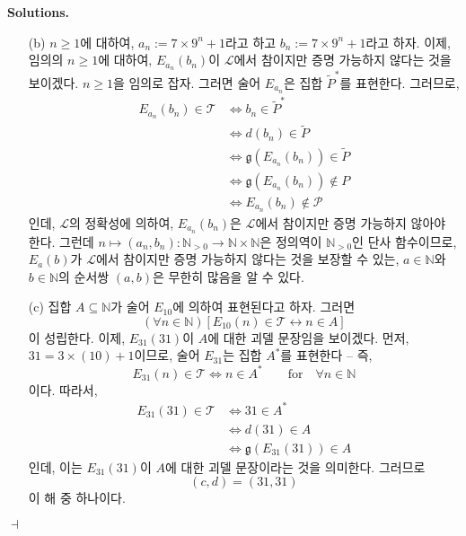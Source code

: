 \documentclass[12pt]{paper}
\newcommand{\gnum}
{ \mathfrak{g} }
\newenvironment{context}[1][]
{ \noindent \textbf{{#1}.} }
{ \hfill $ \dashv $ }
\begin{document}
\begin{context}[Solutions]
\begin{enumerate}
\begin{itemize}
\item[(b)] $n \geq 1$에 대하여, $a_{n} := 7 \times 9^{n} + 1$라고 하고 $b_{n} := 7 \times 9^{n} + 1$라고 하자.
이제, 임의의 $n \geq 1$에 대하여, $E_{a_{n}} \left( b_{n} \right)$이 $\mathcal{L}$에서 참이지만 증명 가능하지 않다는 것을 보이겠다.
$ n \geq 1 $을 임의로 잡자.
그러면 술어 $E_{a_{n}}$은 집합 $\widetilde{P}^{*}$를 표현한다.
그러므로,
\begin{align*}
E_{a_{n}} \left( b_{n} \right) \in \mathcal{T}
& \iff b_{n} \in \widetilde{P}^{*} \\
& \iff d \left( b_{n} \right) \in \widetilde{P} \\
& \iff \gnum \left( E_{a_{n}} \left( b_{n} \right) \right) \in \widetilde{P} \\
& \iff \gnum \left( E_{a_{n}} \left( b_{n} \right) \right) \notin P \\
& \iff E_{a_{n}} \left( b_{n} \right) \notin \mathcal{P}
\end{align*}
인데, $\mathcal{L}$의 정확성에 의하여,
$E_{a_{n}} \left( b_{n} \right)$은 $\mathcal{L}$에서 참이지만 증명 가능하지 않아야 한다.
그런데 $ n \mapsto \left( a_{n} , b_{n} \right) : \mathbb{N}_{>0} \to \mathbb{N} \times \mathbb{N} $은 정의역이 $\mathbb{N}_{>0}$인 단사 함수이므로,
$E_{a} \left( b \right)$가 $\mathcal{L}$에서 참이지만 증명 가능하지 않다는 것을 보장할 수 있는,
$a \in \mathbb{N}$와 $b \in \mathbb{N}$의 순서쌍 $\left( a , b \right)$은 무한히 많음을 알 수 있다.

\item[(c)] 집합 $A \subseteq \mathbb{N}$가 술어 $E_{10}$에 의하여 표현된다고 하자.
그러면 $$ \left( \forall n \in \mathbb{N} \right) \left[ E_{10} \left( n \right) \in \mathcal{T} \leftrightarrow n \in A \right] $$이 성립한다.
이제, $E_{31} \left( 31 \right)$이 $A$에 대한 괴델 문장임을 보이겠다.
먼저, $31 = 3 \times \left( 10 \right) + 1$이므로,
술어 $E_{31}$는 집합 $A^{*}$를 표현한다 --
즉, $$E_{31} \left( n \right) \in \mathcal{T} \iff n \in A^{*} \qquad \mathrm{for} \quad \forall n \in \mathbb{N}$$이다.
따라서,
\begin{align*}
E_{31} \left( 31 \right) \in \mathcal{T}
& \iff 31 \in A^{*} \\
& \iff d \left( 31 \right) \in A \\
& \iff \gnum \left( E_{31} \left( 31 \right) \right) \in A
\end{align*}
인데,
이는 $E_{31} \left( 31 \right)$이 $A$에 대한 괴델 문장이라는 것을 의미한다.
그러므로 $$\left( c , d \right) = \left( 31 , 31 \right)$$이 해 중 하나이다.
\end{itemize}
\end{enumerate}
\end{context}
\end{document}
